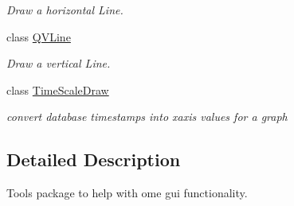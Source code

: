 \begin{DoxyCompactItemize}
\begin{DoxyCompactList}\small\item\em Draw a horizontal Line. \end{DoxyCompactList}\item 
class \mbox{\hyperlink{classguitools_1_1_q_v_line}{Q\+V\+Line}}
\begin{DoxyCompactList}\small\item\em Draw a vertical Line. \end{DoxyCompactList}\item 
class \mbox{\hyperlink{classguitools_1_1_time_scale_draw}{Time\+Scale\+Draw}}
\begin{DoxyCompactList}\small\item\em convert database timestamps into xaxis values for a graph \end{DoxyCompactList}\end{DoxyCompactItemize}


\subsection{Detailed Description}
Tools package to help with ome gui functionality. 
